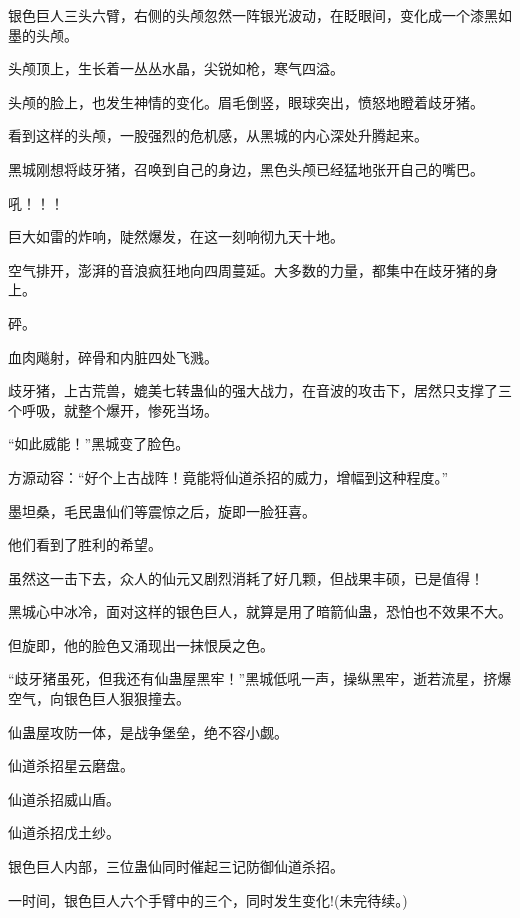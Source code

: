 \begin{this_body}
银色巨人三头六臂，右侧的头颅忽然一阵银光波动，在眨眼间，变化成一个漆黑如墨的头颅。

头颅顶上，生长着一丛丛水晶，尖锐如枪，寒气四溢。

头颅的脸上，也发生神情的变化。眉毛倒竖，眼球突出，愤怒地瞪着歧牙猪。

看到这样的头颅，一股强烈的危机感，从黑城的内心深处升腾起来。

黑城刚想将歧牙猪，召唤到自己的身边，黑色头颅已经猛地张开自己的嘴巴。

吼！！！

巨大如雷的炸响，陡然爆发，在这一刻响彻九天十地。

空气排开，澎湃的音浪疯狂地向四周蔓延。大多数的力量，都集中在歧牙猪的身上。

砰。

血肉飚射，碎骨和内脏四处飞溅。

歧牙猪，上古荒兽，媲美七转蛊仙的强大战力，在音波的攻击下，居然只支撑了三个呼吸，就整个爆开，惨死当场。

“如此威能！”黑城变了脸色。

方源动容：“好个上古战阵！竟能将仙道杀招的威力，增幅到这种程度。”

墨坦桑，毛民蛊仙们等震惊之后，旋即一脸狂喜。

他们看到了胜利的希望。

虽然这一击下去，众人的仙元又剧烈消耗了好几颗，但战果丰硕，已是值得！

黑城心中冰冷，面对这样的银色巨人，就算是用了暗箭仙蛊，恐怕也不效果不大。

但旋即，他的脸色又涌现出一抹恨戾之色。

“歧牙猪虽死，但我还有仙蛊屋黑牢！”黑城低吼一声，操纵黑牢，逝若流星，挤爆空气，向银色巨人狠狠撞去。

仙蛊屋攻防一体，是战争堡垒，绝不容小觑。

仙道杀招星云磨盘。

仙道杀招威山盾。

仙道杀招戊土纱。

银色巨人内部，三位蛊仙同时催起三记防御仙道杀招。

一时间，银色巨人六个手臂中的三个，同时发生变化!(未完待续。)

\end{this_body}

